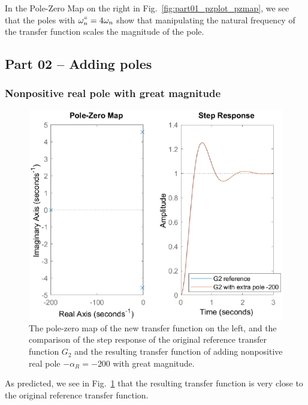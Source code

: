 \documentclass[12pt]{article}
\newcommand{\setprime}[2][1]{%
    {#2}^{%
        \raisebox{1pt}{%
            \scalebox{0.5}{%
                \itshape\sffamily\uppercase%
                \expandafter{%
                    \romannumeral#1%
                }%
            }%
        }
    }%
}%
\begin{document}
In the Pole-Zero Map on the right in Fig.~\ref{fig:part01_pzplot_pzmap}, we see that the poles with $\setprime[3]\omega_n = 4\omega_n$ show that manipulating the natural frequency of the transfer function scales the magnitude of the pole.

\subsection{Part 02 -- Adding poles}

\subsubsection{Nonpositive real pole with great magnitude}

\begin{figure}
    \centering
    \includegraphics{img/part02_nonpositive_real_pole.eps}
    \caption{The pole-zero map of the new transfer function on the left, and the comparison of the step response of the original reference transfer function $G_2$ and the resulting transfer function of adding nonpositive real pole $-\alpha_R = -200$ with great magnitude.}
    \label{fig:nonpositive real poles}
\end{figure}

As predicted, we see in Fig.~\ref{fig:nonpositive real poles} that the resulting transfer function is very close to the original reference transfer function.
\end{document}
